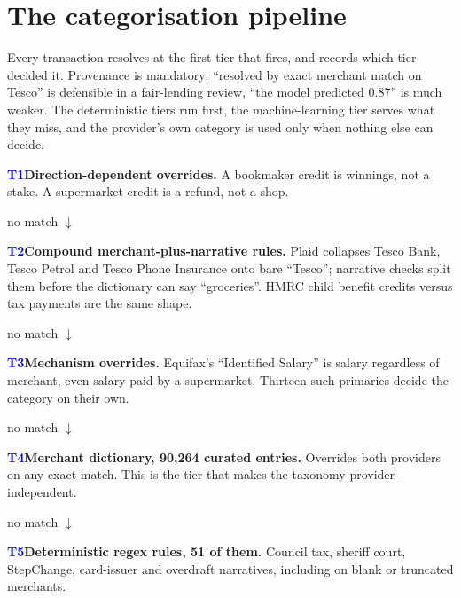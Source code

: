 \section{The categorisation pipeline}
Every transaction resolves at the first tier that fires, and records which tier decided it. Provenance is mandatory: ``resolved by exact merchant match on Tesco'' is defensible in a fair-lending review, ``the model predicted 0.87'' is much weaker. The deterministic tiers run first, the machine-learning tier serves what they miss, and the provider's own category is used only when nothing else can decide.

\begin{tcolorbox}[colback=BlueTint,colframe=BlueTint,arc=2mm]
\textcolor{Blue}{\textbf{T1}}\quad \textbf{Direction-dependent overrides.} A bookmaker credit is winnings, not a stake. A supermarket credit is a refund, not a shop.
\end{tcolorbox}
{\small\color{Muted} no match $\downarrow$\par}
\begin{tcolorbox}[colback=BlueTint,colframe=BlueTint,arc=2mm]
\textcolor{Blue}{\textbf{T2}}\quad \textbf{Compound merchant-plus-narrative rules.} Plaid collapses Tesco Bank, Tesco Petrol and Tesco Phone Insurance onto bare ``Tesco''; narrative checks split them before the dictionary can say ``groceries''. HMRC child benefit credits versus tax payments are the same shape.
\end{tcolorbox}
{\small\color{Muted} no match $\downarrow$\par}
\begin{tcolorbox}[colback=BlueTint,colframe=BlueTint,arc=2mm]
\textcolor{Blue}{\textbf{T3}}\quad \textbf{Mechanism overrides.} Equifax's ``Identified Salary'' is salary regardless of merchant, even salary paid by a supermarket. Thirteen such primaries decide the category on their own.
\end{tcolorbox}
{\small\color{Muted} no match $\downarrow$\par}
\begin{tcolorbox}[colback=BlueTint,colframe=BlueTint,arc=2mm]
\textcolor{Blue}{\textbf{T4}}\quad \textbf{Merchant dictionary, 90,264 curated entries.} Overrides both providers on any exact match. This is the tier that makes the taxonomy provider-independent.
\end{tcolorbox}
{\small\color{Muted} no match $\downarrow$\par}
\begin{tcolorbox}[colback=BlueTint,colframe=BlueTint,arc=2mm]
\textcolor{Blue}{\textbf{T5}}\quad \textbf{Deterministic regex rules, 51 of them.} Council tax, sheriff court, StepChange, card-issuer and overdraft narratives, including on blank or truncated merchants.
\end{tcolorbox}
